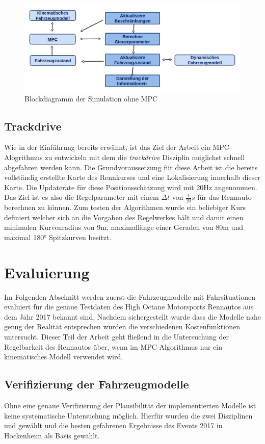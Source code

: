 \documentclass{like}
\begin{document}
\begin{figure}[ht!]
	\centering
	\includegraphics[width=350pt]{Abbildungen/sim_for_loop.png}
	\caption{Blockdiagramm der Simulation ohne MPC}
	\label{fig:block_diagram_sim}
\end{figure}


\section{Trackdrive}
Wie in der Einführung bereits erwähnt, ist das Ziel der Arbeit ein \ac{MPC}-Alogrithmus zu entwickeln mit dem die \emph{trackdrive} Disziplin möglichst schnell abgefahren werden kann. Die Grundvoraussetzung für diese Arbeit ist die bereits vollständig erstellte Karte des Rennkurses und eine Lokalisierung innerhalb dieser Karte. Die Updaterate für diese Positionsschätzung wird mit 20Hz angenommen. Das Ziel ist es also die Regelparameter mit einem $\Delta t$ von $\frac{1}{20} s$ für das Rennauto berechnen zu können.  Zum testen der Algorithmen wurde ein beliebiger Kurs definiert welcher sich an die Vorgaben des Regelwerkes hält und damit einen minimalen Kurvenradius von 9m, maximallänge einer Geraden von 80m und maximal 180° Spitzkurven besitzt.

\chapter{Evaluierung}
Im Folgenden Abschnitt werden zuerst die Fahrzeugmodelle mit Fahrsituationen evaluiert für die genaue Testdaten des High Octane Motorsports Rennautos aus dem Jahr 2017 bekannt sind. 
Nachdem sichergestellt wurde dass die Modelle nahe genug der Realität entsprechen wurden die verschiedenen Kostenfunktionen untersucht. Dieser Teil der Arbeit geht fließend in die Untersuchung der Regelbarkeit des Rennautos über, wenn im MPC-Algorithmus nur ein kinematisches Modell verwendet wird.

\section{Verifizierung der Fahrzeugmodelle}
Ohne eine genaue Verifizierung der Plausibilität der implementierten Modelle ist keine systematische Untersuchung möglich. Hierfür wurden die zwei Disziplinen  und  gewählt und die besten gefahrenen Ergebnisse des Events 2017 in Hockenheim als Basis gewählt.
\end{document}
